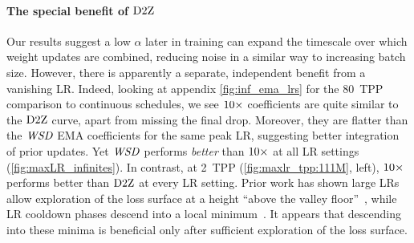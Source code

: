 
\paragraph{The special benefit of $\mbox{D2Z}$}


Our results suggest a low $\alpha$ later in training can expand the
timescale over which weight updates are combined, reducing noise in a
similar way to increasing batch size.
%
However, there is apparently a separate, independent benefit from a
vanishing LR\@.
Indeed, looking at appendix \cref{fig:inf_ema_lrs} for the 80~TPP
comparison to continuous schedules, we see $\mbox{10}\times$ coefficients are
quite similar to the $\mbox{D2Z}$ curve, apart from missing the final drop.
Moreover, they are flatter than the $\mbox{\emph{WSD}}$ EMA coefficients for the
same peak LR, suggesting better integration of prior updates.  Yet
$\mbox{\emph{WSD}}$ performs \emph{better} than $\mbox{10}\times$ at all LR settings
(\cref{fig:maxLR_infinites}).
%
In contrast, at 2~TPP (\cref{fig:maxlr_tpp:111M}, left), $\mbox{10}\times$
performs better than $\mbox{D2Z}$ at every LR setting.
%
Prior work has shown large LRs allow exploration of the loss surface
at a height ``above the valley floor''~\citep{xing2018walk}, while LR
cooldown phases descend into a local
minimum~\citep{hu2024minicpm,hagele2024scaling}.
%
It appears that descending into these minima is beneficial only after
sufficient exploration of the loss surface.

